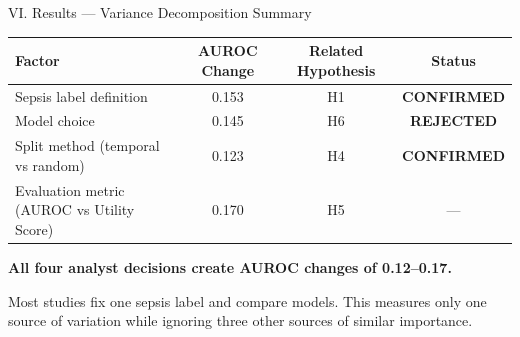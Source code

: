 \documentclass[aspectratio=169,10pt]{beamer}
\newcommand{\tablestyle}{%
  \renewcommand{\arraystretch}{1.2}%
  \small%
}
\begin{document}
\begin{frame}{VI. Results --- Variance Decomposition Summary}
\begin{center}
\tablestyle
\begin{tabular}{lccc}
\toprule
\textbf{Factor} & \textbf{AUROC Change} & \textbf{Related Hypothesis} & \textbf{Status} \\
\midrule
Sepsis label definition & 0.153 & H1 & \textcolor{BabyMint!60!green}{\textbf{CONFIRMED}} \\
Model choice & 0.145 & H6 & \textcolor{BabyPink!70!red}{\textbf{REJECTED}} \\
Split method (temporal vs random) & 0.123 & H4 & \textcolor{BabyMint!60!green}{\textbf{CONFIRMED}} \\
Evaluation metric (AUROC vs Utility Score) & 0.170 & H5 & --- \\
\bottomrule
\end{tabular}
\end{center}

\vspace{8pt}
\textbf{All four analyst decisions create AUROC changes of 0.12--0.17.}

\vspace{4pt}
Most studies fix one sepsis label and compare models. This measures only one source of variation while ignoring three other sources of similar importance.
\end{frame}
\end{document}

